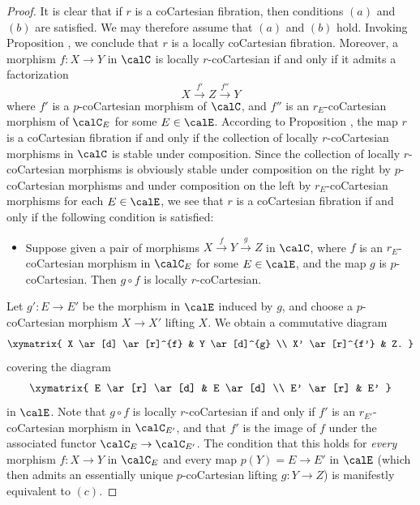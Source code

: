 \begin{proof}
It is clear that if $r$ is a coCartesian fibration, then conditions $(a)$ and $(b)$ are satisfied.
We may therefore assume that $(a)$ and $(b)$ hold. Invoking Proposition , we conclude that $r$ is a locally coCartesian fibration. Moreover, a morphism $f: X \rightarrow Y$ in $\calC$ is locally $r$-coCartesian if and only if it admits a factorization 
$$X \stackrel{f'}{\rightarrow} Z \stackrel{f''}{\rightarrow} Y$$
where $f'$ is a $p$-coCartesian morphism of $\calC$, and $f''$ is an $r_{E}$-coCartesian morphism
of $\calC_{E}$ for some $E \in \calE$. According to Proposition , the map $r$ is a
coCartesian fibration if and only if the collection of locally $r$-coCartesian morphisms in $\calC$ is stable under composition. Since the collection of locally $r$-coCartesian morphisms is obviously stable under composition on the right by $p$-coCartesian morphisms and under composition on the left by
$r_{E}$-coCartesian morphisms for each $E \in \calE$, we see that $r$ is a coCartesian fibration
if and only if the following condition is satisfied:
\begin{itemize}
\item[$(\ast)$] Suppose given a pair of morphisms $X \stackrel{f}{\rightarrow} Y \stackrel{g}{\rightarrow} Z$
in $\calC$, where $f$ is an $r_E$-coCartesian morphism in $\calC_{E}$ for some $E \in \calE$, and 
the map $g$ is $p$-coCartesian. Then $g \circ f$ is locally $r$-coCartesian.
\end{itemize}
Let $g': E \rightarrow E'$ be the morphism in $\calE$ induced by $g$, and choose a
$p$-coCartesian morphism $X \rightarrow X'$ lifting $X$. We obtain a commutative diagram
$$ \xymatrix{ X \ar[d] \ar[r]^{f} & Y \ar[d]^{g} \\
X' \ar[r]^{f'} & Z. }$$
covering the diagram
$$ \xymatrix{ E \ar[r] \ar[d] & E \ar[d] \\
E' \ar[r] & E' }$$
in $\calE$. Note that $g \circ f$ is locally $r$-coCartesian if and only if $f'$ is 
an $r_{E'}$-coCartesian morphism in $\calC_{E'}$, and that $f'$ is the image of $f$ under
the associated functor $\calC_{E} \rightarrow \calC_{E'}$. The condition that this holds
for {\em every} morphism $f: X \rightarrow Y$ in $\calC_{E}$ and every map $p(Y) = E \rightarrow E'$
in $\calE$ (which then admits an essentially unique $p$-coCartesian lifting $g: Y \rightarrow Z$) is
manifestly equivalent to $(c)$.
\end{proof}

